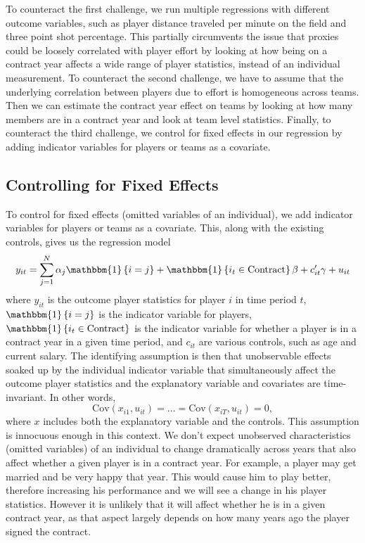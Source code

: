 \documentclass[12pt]{article}
\begin{document}
	To counteract the first challenge, we run multiple regressions with different outcome variables, such as player distance traveled per minute on the field and three point shot percentage. This partially circumvents the issue that proxies could be loosely correlated with player effort by looking at how being on a contract year affects a wide range of player statistics, instead of an individual measurement. To counteract the second challenge, we have to assume that the underlying correlation between players due to effort is homogeneous across teams. Then we can estimate the contract year effect on teams by looking at how many members are in a contract year and look at team level statistics. Finally, to counteract the third challenge, we control for fixed effects in our regression by adding indicator variables for players or teams as a covariate.
	
	\subsection{Controlling for Fixed Effects}
	
	To control for fixed effects (omitted variables of an individual), we add indicator variables for players or teams as a covariate. This, along with the existing controls, gives us the regression model \[
	y_{it} = \sum_{j=1}^N \alpha_j \mathbbm{1}\left\lbrace i= j \right\rbrace + \mathbbm{1}\left\lbrace i_t\in \mathrm{Contract} \right\rbrace\beta + c_{it}'\gamma + u_{it}
	\] where $y_{it}$ is the outcome player statistics for player $i$ in time period $t$, $\mathbbm{1}\left\lbrace i= j \right\rbrace$ is the indicator variable for players, $\mathbbm{1}\left\lbrace i_t\in \mathrm{Contract} \right\rbrace$ is the indicator variable for whether a player is in a contract year in a given time period, and $c_{it}$ are various controls, such as age and current salary. The identifying assumption is then that unobservable effects soaked up by the individual indicator variable that simultaneously affect the outcome player statistics and the explanatory variable and covariates are time-invariant. In other words, \[
	\mathrm{Cov}\left(x_{i1}, u_{it}\right) = \dots = \mathrm{Cov}\left(x_{iT}, u_{it}\right) = 0,
	\] where $x$ includes both the explanatory variable and the controls. This assumption is innocuous enough in this context. We don't expect unobserved characteristics (omitted variables) of an individual to change dramatically across years that also affect whether a given player is in a contract year. For example, a player may get married and be very happy that year. This would cause him to play better, therefore increasing his performance and we will see a change in his player statistics. However it is unlikely that it will affect whether he is in a given contract year, as that aspect largely depends on how many years ago the player signed the contract.
	
\end{document}
